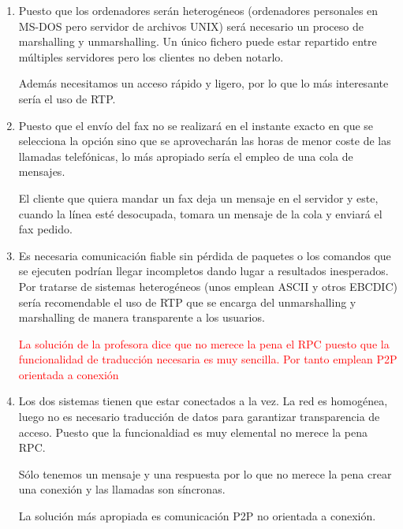 \begin{problem}[14]
    \begin{enumerate}
    \item

    Puesto que los ordenadores serán heterogéneos (ordenadores personales en MS-DOS pero servidor de archivos UNIX)  será necesario un proceso de marshalling y unmarshalling. Un único fichero puede estar repartido entre múltiples servidores pero los clientes no deben notarlo.

    Además necesitamos un acceso rápido y ligero, por lo que lo más interesante sería el uso de RTP.

    \item

    Puesto que el envío del fax no se realizará en el instante exacto en que se selecciona la opción sino que se aprovecharán las horas de menor coste de las llamadas telefónicas, lo más apropiado sería el empleo de una cola de mensajes.

    El cliente que quiera mandar un fax deja un mensaje en el servidor y este, cuando la línea esté desocupada, tomara un mensaje de la cola y enviará el fax pedido.

    \item

    Es necesaria comunicación fiable sin pérdida de paquetes o los comandos que se ejecuten podrían llegar incompletos dando lugar a resultados inesperados. Por tratarse de sistemas heterogéneos (unos emplean ASCII y otros EBCDIC) sería recomendable el uso de RTP que se encarga del unmarshalling y marshalling de manera transparente a los usuarios.

    \textcolor{red}{La solución de la profesora dice que no merece la pena el RPC puesto que la funcionalidad de traducción necesaria es muy sencilla. Por tanto emplean P2P orientada a conexión}

    \item

   Los dos sistemas tienen que estar conectados a la vez. La red es homogénea, luego no es necesario traducción de datos para garantizar transparencia de acceso.
   Puesto que la funcionaldiad es muy elemental no merece la pena RPC.

   Sólo tenemos un mensaje y una respuesta por lo que no merece la pena crear
   una conexión y las llamadas son síncronas.

  La solución más apropiada es comunicación P2P no orientada a conexión.

    \end{enumerate}

    \end{problem}



